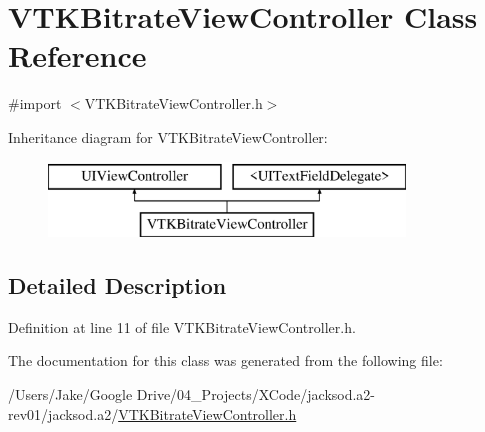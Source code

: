 \hypertarget{interface_v_t_k_bitrate_view_controller}{\section{V\+T\+K\+Bitrate\+View\+Controller Class Reference}
\label{interface_v_t_k_bitrate_view_controller}
}


{\ttfamily \#import $<$V\+T\+K\+Bitrate\+View\+Controller.\+h$>$}

Inheritance diagram for V\+T\+K\+Bitrate\+View\+Controller\+:\begin{figure}[H]
\begin{center}
\leavevmode
\includegraphics[height=2.000000cm]{interface_v_t_k_bitrate_view_controller}
\end{center}
\end{figure}


\subsection{Detailed Description}


Definition at line 11 of file V\+T\+K\+Bitrate\+View\+Controller.\+h.



The documentation for this class was generated from the following file\+:\begin{DoxyCompactItemize}
\item 
/\+Users/\+Jake/\+Google Drive/04\+\_\+\+Projects/\+X\+Code/jacksod.\+a2-\/rev01/jacksod.\+a2/\hyperlink{_v_t_k_bitrate_view_controller_8h}{V\+T\+K\+Bitrate\+View\+Controller.\+h}\end{DoxyCompactItemize}
